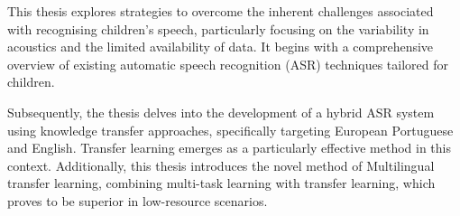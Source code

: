 




\noindent This thesis explores strategies to overcome the inherent challenges associated with recognising children's speech, particularly focusing on the variability in acoustics and the limited availability of data. It begins with a comprehensive overview of existing automatic speech recognition (ASR) techniques tailored for children.

Subsequently, the thesis delves into the development of a hybrid ASR system using knowledge transfer approaches, specifically targeting European Portuguese and English. Transfer learning emerges as a particularly effective method in this context. Additionally, this thesis introduces the novel method of Multilingual transfer learning, combining multi-task learning with transfer learning, which proves to be superior in low-resource scenarios.

